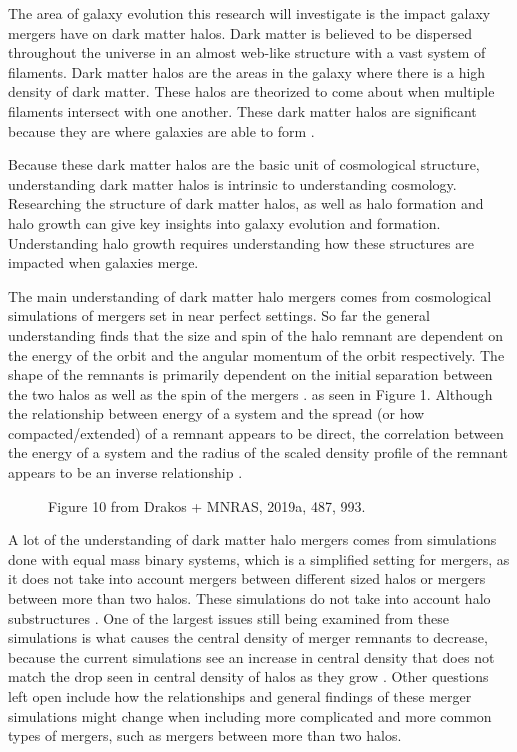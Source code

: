 \documentclass[linenumbers,trackchanges]{aastex7}
\begin{document}
The area of galaxy evolution this research will investigate is the impact galaxy mergers have on dark matter halos. Dark matter is believed to be dispersed throughout the universe in an almost web-like structure with a vast system of filaments. Dark matter halos are the areas in the galaxy where there is a high density of dark matter. These halos are theorized to come about when multiple filaments intersect with one another. These dark matter halos are significant because they are where galaxies are able to form \cite{Frenk_2012}.

Because these dark matter halos are the basic unit of cosmological structure, understanding dark matter halos is intrinsic to understanding cosmology. Researching the structure of dark matter halos, as well as halo formation and halo growth can give key insights into galaxy evolution and formation. Understanding halo growth requires understanding how these structures are impacted when galaxies merge. 

The main understanding of dark matter halo mergers comes from cosmological simulations of mergers set in near perfect settings. So far the general understanding finds that the size  and spin of the halo remnant are dependent on the energy of the orbit and the angular momentum of the orbit respectively. The shape of the remnants is primarily dependent on the initial separation between the two halos as well as the spin of the mergers \cite{2019MNRAS.487..993D}. as seen in Figure 1. Although the relationship between energy of a system and the spread (or how compacted/extended) of a remnant appears to be direct, the correlation between the energy of a system and the radius of the scaled density profile of the remnant appears to be an inverse relationship \cite{2019MNRAS.487.1008D}.

\begin{figure}[ht!]
\caption{Figure 10 from Drakos + MNRAS, 2019a, 487, 993.
\label{fig:general}}
\end{figure}



A lot of the understanding of dark matter halo mergers comes from simulations done with equal mass binary systems, which is a simplified setting for mergers, as it does not take into account mergers between different sized halos or mergers between more than two halos. These simulations do not take into account halo substructures \cite{2019MNRAS.487..993D}. One of the largest issues still being examined from these simulations is what causes the central density of merger remnants to decrease, because the current simulations see an increase in central density that does not match the drop seen in central density of halos as they grow \cite{2019MNRAS.487.1008D}. Other questions left open include how the relationships and general findings of these merger simulations might change when including more complicated and more common types of mergers, such as mergers between more than two halos. 
\end{document}
